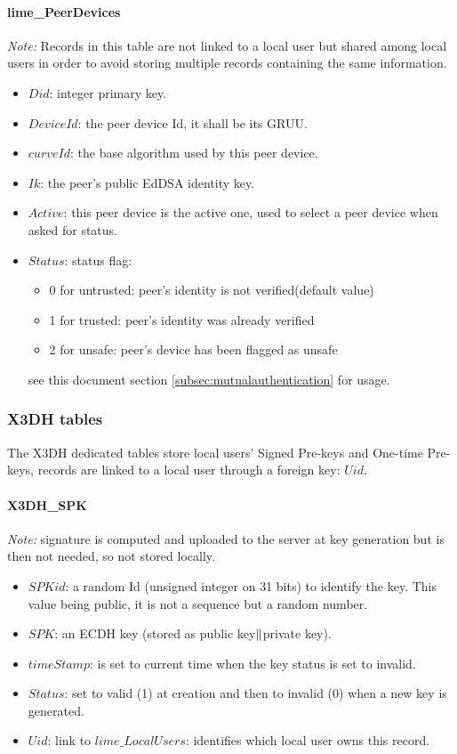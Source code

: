 \documentclass[a4paper,11pt]{article}
\begin{document}
    \paragraph*{lime\_PeerDevices}
    \textit{Note:} Records in this table are not linked to a local user but shared among local users in order to avoid storing multiple records containing the same information.
    \begin{itemize}
      \item $Did$: integer primary key.
      \item $DeviceId$: the peer device Id, it shall be its GRUU.
      \item $curveId$: the base algorithm used by this peer device.
      \item $Ik$: the peer's public EdDSA identity key.
      \item $Active$: this peer device is the active one, used to select a peer device when asked for status.
      \item $Status$: status flag:
        \begin{itemize}
          \item 0 for untrusted: peer's identity is not verified(default value)
          \item 1 for trusted: peer's identity was already verified
          \item 2 for unsafe: peer's device has been flagged as unsafe
        \end{itemize}
        see this document section \ref{subsec:mutualauthentication} for usage.
    \end{itemize}

    \subsubsection{X3DH tables}
    The X3DH dedicated tables store local users' Signed Pre-keys and One-time Pre-keys, records are linked to a local user through a foreign key: $Uid$.
    \paragraph*{X3DH\_SPK}
    \textit{Note:} signature is computed and uploaded to the server at key generation but is then not needed, so not stored locally.
    \begin{itemize}
      \item $SPKid$: a random Id (unsigned integer on 31 bits) to identify the key. This value being public, it is not a sequence but a random number.
      \item $SPK$: an ECDH key (stored as public key$\Arrowvert $private key).
      \item $timeStamp$: is set to current time when the key status is set to invalid.
      \item $Status$: set to valid (1) at creation and then to invalid (0) when a new key is generated.
      \item $Uid$: link to $lime\_LocalUsers$: identifies which local user owns this record.
    \end{itemize}
\end{document}
